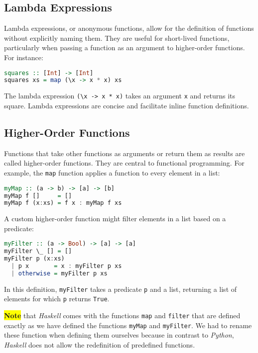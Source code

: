 \subsection{Lambda Expressions}
Lambda expressions, or anonymous functions, allow for the definition of functions without explicitly naming them. They are useful for short-lived functions, particularly when passing a function as an argument to higher-order functions. For instance:
\begin{lstlisting}[style=haskellstyle, language=Haskell]
squares :: [Int] -> [Int]
squares xs = map (\x -> x * x) xs
\end{lstlisting}
The lambda expression \texttt{(\textbackslash x -> x * x)} takes an argument \texttt{x} and returns its square. Lambda expressions are concise and facilitate inline function definitions.

\subsection{Higher-Order Functions}

Functions that take other functions as arguments or return them as results are called higher-order functions. They are central to functional programming. For example, the \texttt{map} function applies a function to every element in a list:
\begin{lstlisting}[style=haskellstyle, language=Haskell]
myMap :: (a -> b) -> [a] -> [b]
myMap f []     = []
myMap f (x:xs) = f x : myMap f xs
\end{lstlisting}
A custom higher-order function might filter elements in a list based on a predicate:
\begin{lstlisting}[style=haskellstyle, language=Haskell]
myFilter :: (a -> Bool) -> [a] -> [a]
myFilter \_ [] = []
myFilter p (x:xs)
  | p x       = x : myFilter p xs
  | otherwise = myFilter p xs
\end{lstlisting}
In this definition, \texttt{myFilter} takes a predicate \texttt{p} and a list, returning a list of elements for which \texttt{p} returns \texttt{True}.

\noindent
\colorbox{yellow}{\textbf{Note}} that \textsl{Haskell} comes with the functions \texttt{map} and
\texttt{filter} that are defined exactly as we have defined the functions \texttt{myMap} and \texttt{myFilter}.
We had to rename these function when defining them ourselves because in contrast to \textsl{Python},
\textsl{Haskell} does not allow the redefinition of predefined functions.

